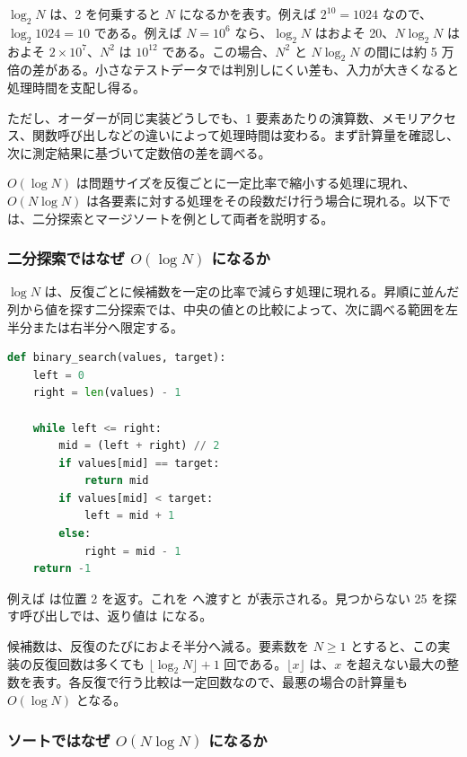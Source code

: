 \(\log_2 N\) は、2 を何乗すると \(N\) になるかを表す。例えば \(2^{10}=1024\) なので、\(\log_2 1024=10\) である。例えば $N = 10^6$ なら、$\log_2 N$ はおよそ 20、$N \log_2 N$ はおよそ $2 \times 10^7$、$N^2$ は $10^{12}$ である。この場合、\(N^2\) と \(N\log_2 N\) の間には約 5 万倍の差がある。小さなテストデータでは判別しにくい差も、入力が大きくなると処理時間を支配し得る。

ただし、オーダーが同じ実装どうしでも、1 要素あたりの演算数、メモリアクセス、関数呼び出しなどの違いによって処理時間は変わる。まず計算量を確認し、次に測定結果に基づいて定数倍の差を調べる。

$O(\log N)$ は問題サイズを反復ごとに一定比率で縮小する処理に現れ、$O(N \log N)$ は各要素に対する処理をその段数だけ行う場合に現れる。以下では、二分探索とマージソートを例として両者を説明する。

\subsubsection{二分探索ではなぜ \texorpdfstring{$O(\log N)$}{O(log N)} になるか}

\(\log N\) は、反復ごとに候補数を一定の比率で減らす処理に現れる。昇順に並んだ列から値を探す二分探索では、中央の値との比較によって、次に調べる範囲を左半分または右半分へ限定する。

\begin{lstlisting}[language=Python]
def binary_search(values, target):
    left = 0
    right = len(values) - 1

    while left <= right:
        mid = (left + right) // 2
        if values[mid] == target:
            return mid
        if values[mid] < target:
            left = mid + 1
        else:
            right = mid - 1
    return -1
\end{lstlisting}

例えば  は位置 2 を返す。これを  へ渡すと  が表示される。見つからない 25 を探す呼び出しでは、返り値は  になる。

候補数は、反復のたびにおよそ半分へ減る。要素数を \(N\geq1\) とすると、この実装の反復回数は多くても \(\lfloor\log_2 N\rfloor+1\) 回である。\(\lfloor x\rfloor\) は、\(x\) を超えない最大の整数を表す。各反復で行う比較は一定回数なので、最悪の場合の計算量も \(O(\log N)\) となる。

\subsubsection{ソートではなぜ \texorpdfstring{$O(N \log N)$}{O(N log N)} になるか}

